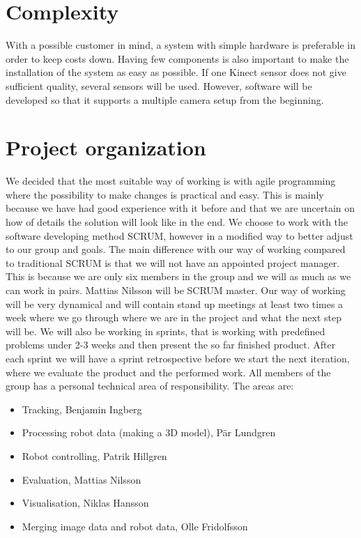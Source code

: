 \documentclass[10pt,a4paper]{article}
\begin{document}
\section{Complexity}
With a possible customer in mind, a system with simple hardware is preferable in order to keep costs down. Having few components is also important to make the installation of the system as easy as possible. If one Kinect sensor does not give sufficient quality, several sensors will be used. However, software will be developed so that it supports a multiple camera setup from the beginning.

\section{Project organization}
We decided that the most suitable way of working is with agile programming where the possibility to make changes is practical and easy. This is mainly because we have had good experience with it before and that we are uncertain on how of details the solution will look like in the end. We choose to work with the software developing method SCRUM, however in a modified way to better adjust to our group and goals. The main difference with our way of working compared to traditional SCRUM is that we will not have an appointed project manager. This is because we are only six members in the group and we will as much as we can work in pairs. Mattias Nilsson will be SCRUM master. Our way of working will be very dynamical and will contain stand up meetings at least two times a week where we go through where we are in the project and what the next step will be. We will also be working in sprints, that is working with predefined problems under 2-3 weeks and then present the so far finished product. After each sprint we will have a sprint retrospective before we start the next iteration, where we evaluate the product and the performed work.
All members of the group has a personal technical area of responsibility. The areas are:

\begin{itemize}
\item Tracking, Benjamin Ingberg
\item Processing robot data (making a 3D model), Pär Lundgren  
\item Robot controlling, Patrik Hillgren
\item Evaluation, Mattias Nilsson
\item Visualisation, Niklas Hansson
\item Merging image data and robot data, Olle Fridolfsson
\end{itemize}
\end{document}
